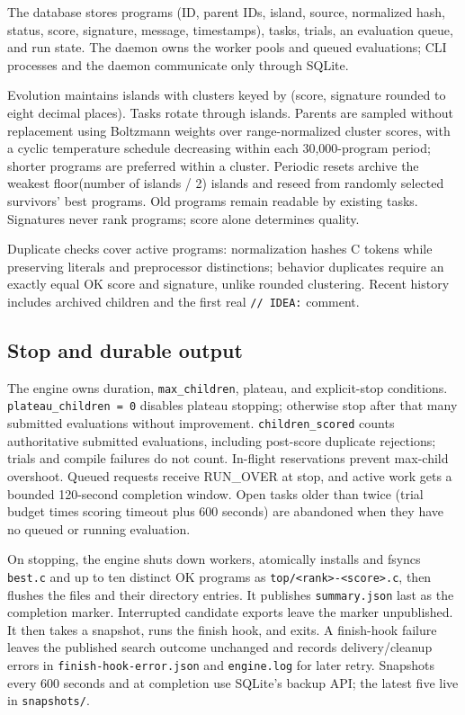 \documentclass[11pt]{article}
\newcommand{\code}[1]{\texttt{#1}}
\begin{document}
The database stores programs (ID, parent IDs, island, source, normalized hash,
status, score, signature, message, timestamps), tasks, trials, an evaluation
queue, and run state. The daemon owns the worker pools and queued evaluations;
CLI processes and the daemon communicate only through SQLite.

Evolution maintains islands with clusters keyed by (score, signature rounded
to eight decimal places). Tasks rotate through islands. Parents are sampled
without replacement using Boltzmann weights over range-normalized cluster scores,
with a cyclic temperature schedule decreasing within each 30,000-program period;
shorter programs are preferred within a cluster. Periodic resets archive the
weakest floor(number of islands / 2) islands and reseed from randomly selected
survivors' best programs. Old programs remain readable by existing tasks.
Signatures never rank programs; score alone determines quality.

Duplicate checks cover active programs: normalization hashes C tokens while
preserving literals and preprocessor distinctions; behavior duplicates require
an exactly equal OK score and signature, unlike rounded clustering. Recent
history includes archived children and the first real \code{// IDEA:} comment.

\subsection{Stop and durable output}
The engine owns duration, \code{max\_children}, plateau, and explicit-stop
conditions. \code{plateau\_children = 0} disables plateau stopping; otherwise
stop after that many submitted evaluations without improvement.
\code{children\_scored} counts authoritative submitted evaluations, including
post-score duplicate rejections; trials and compile failures do not count.
In-flight reservations prevent max-child overshoot. Queued requests receive
RUN\_OVER at stop, and active work gets a bounded 120-second completion window.
Open tasks older than twice (trial budget times scoring timeout plus 600 seconds)
are abandoned when they have no queued or running evaluation.

On stopping, the engine shuts down workers, atomically installs and fsyncs
\code{best.c} and up to ten distinct OK programs as \code{top/<rank>-<score>.c},
then flushes the files and their directory entries. It publishes
\code{summary.json} last as the completion marker. Interrupted candidate
exports leave the marker unpublished.
It then takes a snapshot, runs the finish hook, and exits. A finish-hook failure
leaves the published search outcome unchanged and records delivery/cleanup errors
in \code{finish-hook-error.json} and \code{engine.log} for later retry.
Snapshots every 600 seconds and at completion
use SQLite's backup API; the latest five live in \code{snapshots/}.
\end{document}
